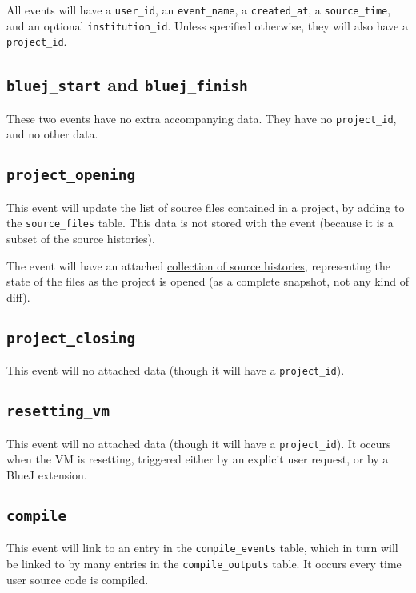 \documentclass{book}
\begin{document}
All events will have a \texttt{user\_id}, an \texttt{event\_name}, a
\texttt{created\_at}, a \texttt{source\_time},
and an optional
\texttt{institution\_id}.  Unless specified otherwise, they will also have a \texttt{project\_id}.

\subsection{\texttt{bluej\_start} and \texttt{bluej\_finish}}

These two events have no extra accompanying data.  They have no
\texttt{project\_id}, and no other data.

\subsection{\texttt{project\_opening}}

This event will update the list of source files contained in a project, by
adding to the \texttt{source\_files} table.  This data is not stored with the
event (because it is a subset of the source histories).

The event will have an attached \hyperref[tab:source_histories]{collection of
  source histories}, representing the state of the files as the project is
opened (as a complete snapshot, not any kind of diff).

\subsection{\texttt{project\_closing}}

This event will no attached data (though it will have a \texttt{project\_id}).

\subsection{\texttt{resetting\_vm}}

This event will no attached data (though it will have a
\texttt{project\_id}).  It occurs when the VM is resetting, triggered either
by an explicit user request, or by a BlueJ extension.

\subsection{\texttt{compile}}

This event will link to an entry in the \texttt{compile\_events} table, which
in turn will be linked to by many entries in the \texttt{compile\_outputs}
table.  It occurs every time user source code is compiled.
\end{document}
